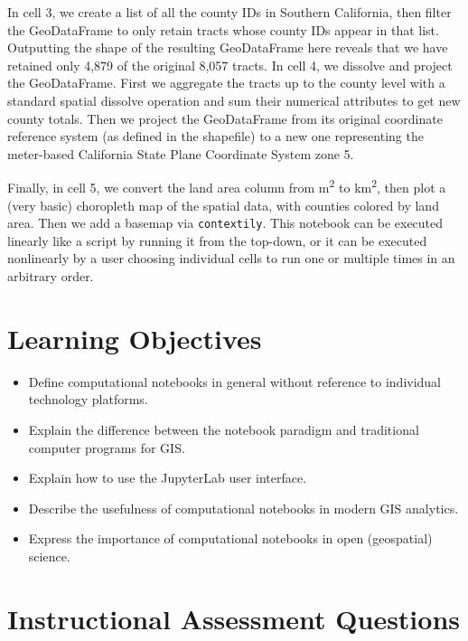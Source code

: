 \documentclass[11pt,letterpaper]{article}
\begin{document}
In cell 3, we create a list of all the county IDs in Southern California, then filter the GeoDataFrame to only retain tracts whose county IDs appear in that list. Outputting the shape of the resulting GeoDataFrame here reveals that we have retained only 4,879 of the original 8,057 tracts. In cell 4, we dissolve and project the GeoDataFrame. First we aggregate the tracts up to the county level with a standard spatial dissolve operation and sum their numerical attributes to get new county totals. Then we project the GeoDataFrame from its original coordinate reference system (as defined in the shapefile) to a new one representing the meter-based California State Plane Coordinate System zone 5.

Finally, in cell 5, we convert the land area column from m\textsuperscript{2} to km\textsuperscript{2}, then plot a (very basic) choropleth map of the spatial data, with counties colored by land area. Then we add a basemap via \texttt{contextily}. This notebook can be executed linearly like a script by running it from the top-down, or it can be executed nonlinearly by a user choosing individual cells to run one or multiple times in an arbitrary order.

\setlength{\bibsep}{0.00cm plus 0.05cm}



\section*{Learning Objectives}

\begin{itemize}
    \item Define computational notebooks in general without reference to individual technology platforms.
    \item Explain the difference between the notebook paradigm and traditional computer programs for GIS.
    \item Explain how to use the JupyterLab user interface.
    \item Describe the usefulness of computational notebooks in modern GIS analytics.
    \item Express the importance of computational notebooks in open (geospatial) science.
\end{itemize}

\section*{Instructional Assessment Questions}
\end{document}
